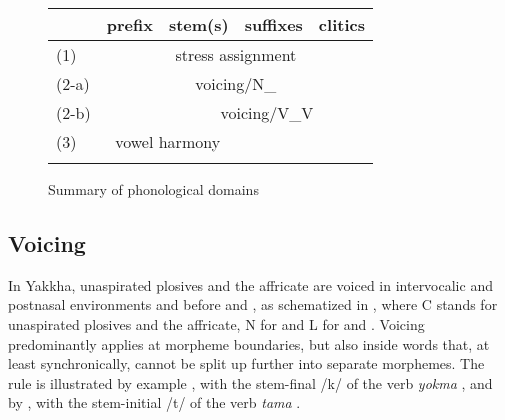 



\begin{figure}[htp]
\begin{center}
\begin{tabular}{l|l|l|l|l} 
 \lsptoprule
	&{\bf prefix}&{\bf stem(s)}&{\bf suffixes}&{\bf clitics}\\
\hline
(1)	&\cellcolor[gray]{.8}	&\multicolumn{2}{c|}{stress assignment}&\cellcolor[gray]{.8}\\
\hline
(2-a)&	\multicolumn{4}{c}{voicing/N\_}\\
\hline
(2-b)&\cellcolor[gray]{.8}	&\multicolumn{3}{c}{voicing/V\_V}\\
\hline
(3)&\multicolumn{2}{c|}{vowel harmony}&\cellcolor[gray]{.8}&\cellcolor[gray]{.8}\\
\lspbottomrule
\end{tabular}
\caption{Summary of phonological domains}\label{w-domains}
\end{center}
\end{figure}

\subsection{Voicing}\label{voicing}

In Yakkha, unaspirated plosives and the affricate are voiced in intervocalic and postnasal environments and before  and , as schematized in , where C stands for unaspirated plosives and the affricate, N for  and L for  and . Voicing predominantly  applies at morpheme boundaries, but also inside words that, at least synchronically, cannot be split up further into separate morphemes. The rule is illustrated by example \Next, with the stem-final /k/ of the verb \emph{yokma} , and by \NNext, with the stem-initial /t/ of the verb \emph{tama} . 

